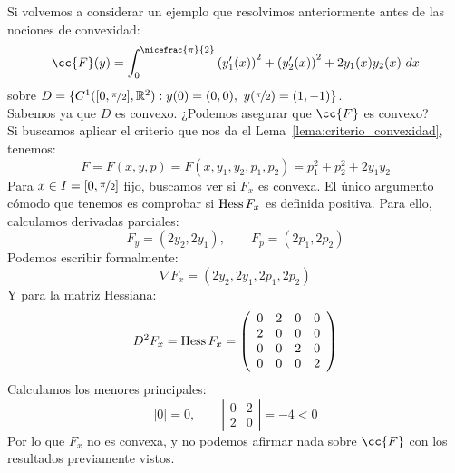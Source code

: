 \begin{ejemplo}
    Si volvemos a considerar un ejemplo que resolvimos anteriormente antes de las nociones de convexidad:
    \begin{equation*}
        \cc{F}(y) = \int_{0}^{\nicefrac{\pi}{2}} {(y_1'(x))}^{2} + {(y_2'(x))}^{2} + 2y_1(x)y_2(x)~dx 
    \end{equation*}
    sobre $D = \{C^1([0,\nicefrac{\pi}{2}], \mathbb{R}^2) : y(0) = (0,0),\ y(\nicefrac{\pi}{2}) = (1,-1)\}$.\\

    \noindent
    Sabemos ya que $D$ es convexo. ¿Podemos asegurar que $\cc{F}$ es convexo?\\

    \noindent
    Si buscamos aplicar el criterio que nos da el Lema~\ref{lema:criterio_convexidad}, tenemos:
    \begin{equation*}
        F = F(x,y,p) = F(x,y_1,y_2,p_1,p_2) = p_1^2 + p_2^2 + 2y_1y_2
    \end{equation*}
    Para $x\in I=[0,\nicefrac{\pi}{2}]$ fijo, buscamos ver si $F_x$ es convexa. El único argumento cómodo que tenemos es comprobar si $\operatorname{Hess} F_x$ es definida positiva. Para ello, calculamos derivadas parciales:
    \begin{equation*}
        F_y = (2y_2, 2y_1), \qquad F_p = (2p_1, 2p_2)
    \end{equation*}
    Podemos escribir formalmente:
    \begin{equation*}
        \nabla F_x = (2y_2, 2y_1, 2p_1, 2p_2)
    \end{equation*}
    Y para la matriz Hessiana:
    \begin{equation*}
        D^2 F_x = \operatorname{Hess} F_x = \left(\begin{array}{cccc}
            0 & 2 & 0 & 0 \\
            2 & 0 & 0 & 0 \\
            0 & 0 & 2 & 0 \\
            0 & 0 & 0 & 2 
        \end{array}\right)
    \end{equation*}
    Calculamos los menores principales:
    \begin{equation*}
        |0| = 0, \qquad \left|\begin{array}{cc}
            0 & 2 \\
            2 & 0 
        \end{array}\right| = -4 < 0
    \end{equation*}
    Por lo que $F_x$ no es convexa, y no podemos afirmar nada sobre $\cc{F}$ con los resultados previamente vistos.
\end{ejemplo}

